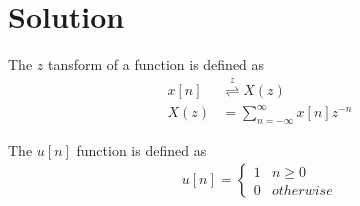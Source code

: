 \documentclass[journal,12pt,twocolumn]{IEEEtran}
\providecommand{\z}{\overset{z}{ \rightleftharpoons}}
\begin{document}
\section{Solution}
\begin{definition}\label{def:z}
    The $z$ tansform of a function is defined as
    \begin{align}
        x[n] &\z X(z)\\
        X(z) &=\sum_{n=-\infty}^{\infty} x[n]z^{-n}
    \end{align}
\end{definition}
\begin{definition}\label{def:u_n}
    The $u[n]$ function is defined as
    \begin{align}
        u[n] = 
        \begin{cases}
        1 & n\geq0\\
        0 & otherwise
        \end{cases}
    \end{align}
\end{definition}
\end{document}

